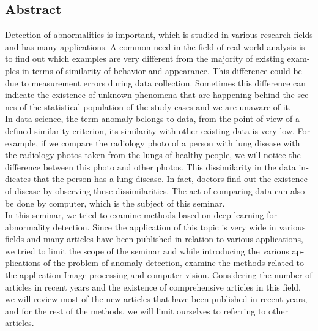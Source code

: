 \documentclass[12pt,a4paper]{report}
\begin{document}




\printindex
\newpage
\begin{latin}
\chapter*{Abstract}
Detection of abnormalities is important, which is studied in various research fields and has many applications. A common need in the field of real-world analysis is to find out which examples are very different from the majority of existing examples in terms of similarity of behavior and appearance. This difference could be due to measurement errors during data collection. Sometimes this difference can indicate the existence of unknown phenomena that are happening behind the scenes of the statistical population of the study cases and we are unaware of it.\\

In data science, the term anomaly belongs to data, from the point of view of a defined similarity criterion, its similarity with other existing data is very low. For example, if we compare the radiology photo of a person with lung disease with the radiology photos taken from the lungs of healthy people, we will notice the difference between this photo and other photos. This dissimilarity in the data indicates that the person has a lung disease. In fact, doctors find out the existence of disease by observing these dissimilarities. The act of comparing data can also be done by computer, which is the subject of this seminar.\\

In this seminar, we tried to examine methods based on deep learning for abnormality detection. Since the application of this topic is very wide in various fields and many articles have been published in relation to various applications, we tried to limit the scope of the seminar and while introducing the various applications of the problem of anomaly detection, examine the methods related to the application Image processing and computer vision. Considering the number of articles in recent years and the existence of comprehensive articles in this field, we will review most of the new articles that have been published in recent years, and for the rest of the methods, we will limit ourselves to referring to other articles.


\end{latin}
\end{document}
